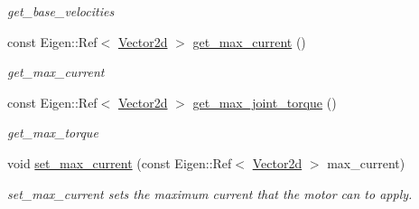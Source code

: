 \begin{DoxyCompactItemize}
\begin{DoxyCompactList}\small\item\em get\+\_\+base\+\_\+velocities \end{DoxyCompactList}\item 
const Eigen\+::\+Ref$<$ \hyperlink{common__header_8hpp_acb6916bc8c9fe9d98c484fd4cc201447}{Vector2d} $>$ \hyperlink{classblmc__robots_1_1Stuggihop_a5a68ae4700c53672c30d373cc3b5b66c}{get\+\_\+max\+\_\+current} ()
\begin{DoxyCompactList}\small\item\em get\+\_\+max\+\_\+current \end{DoxyCompactList}\item 
const Eigen\+::\+Ref$<$ \hyperlink{common__header_8hpp_acb6916bc8c9fe9d98c484fd4cc201447}{Vector2d} $>$ \hyperlink{classblmc__robots_1_1Stuggihop_a4d0344d8fa31e2e959dfcb3c3f5538e9}{get\+\_\+max\+\_\+joint\+\_\+torque} ()
\begin{DoxyCompactList}\small\item\em get\+\_\+max\+\_\+torque \end{DoxyCompactList}\item 
void \hyperlink{classblmc__robots_1_1Stuggihop_a8be641fdc498b04a52bb721f14c449c3}{set\+\_\+max\+\_\+current} (const Eigen\+::\+Ref$<$ \hyperlink{common__header_8hpp_acb6916bc8c9fe9d98c484fd4cc201447}{Vector2d} $>$ max\+\_\+current)
\begin{DoxyCompactList}\small\item\em set\+\_\+max\+\_\+current sets the maximum current that the motor can to apply. \end{DoxyCompactList}\end{DoxyCompactItemize}
